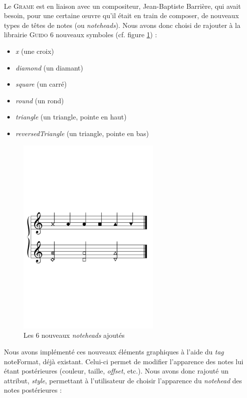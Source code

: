\documentclass[a4paper,10pt,twocolumn]{article}
\newenvironment{code}
  {\fontfamily{pnc}\selectfont}{}
\begin{document}
\paragraph{}
Le \textsc{Grame} est en liaison avec un compositeur, Jean-Baptiste Barrière, qui avait besoin, pour une certaine œuvre qu'il était en train de composer, de nouveaux types de têtes de notes (ou \emph{noteheads}).
Nous avons donc choisi de rajouter à la librairie \textsc{Guido} 6 nouveaux symboles (cf. figure \ref{fig:noteheads}) :
%
\begin{itemize}
    \item \emph{x} (une croix)
    \item \emph{diamond} (un diamant)
    \item \emph{square} (un carré)
    \item \emph{round} (un rond)
    \item \emph{triangle} (un triangle, pointe en haut)
    \item \emph{reversedTriangle} (un triangle, pointe en bas)
\end{itemize} 
%
\begin{figure}[h]
\centering
\includegraphics[width=7cm]{img/partitions/noteheads.pdf}
\caption{Les 6 nouveaux \emph{noteheads} ajoutés}
\label{fig:noteheads}
\end{figure}
%
Nous avons implémenté ces nouveaux éléments graphiques à l'aide du \emph{tag} \begin{code}noteFormat\end{code}, déjà existant. Celui-ci permet de modifier l'apparence des notes lui étant postérieures (couleur, taille, \emph{offset}, etc.). Nous avons donc rajouté un attribut, \emph{style}, permettant à l'utilisateur de choisir l'apparence du \emph{notehead} des notes postérieures :
%
\end{document}

